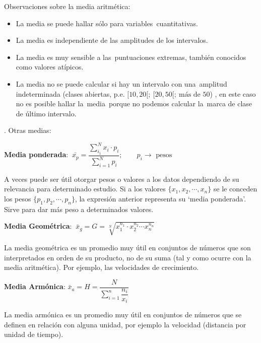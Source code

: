\begin{destacado}
Observaciones sobre la media aritmética:

\begin{adjustwidth}{20pt}{0pt}
\begin{itemize}
	
\item La media se puede hallar sólo para variables cuantitativas.
 
\item La media es independiente de las amplitudes de los intervalos.
 
\item La media es muy sensible a las puntuaciones extremas, también conocidos como valores atípicos.  

\item La media no se puede calcular si hay un intervalo con una amplitud indeterminada (clases abiertas, p.e. $[10,20[; \ [20,50[; \ \text{más de } 50$) ,  en este caso no es posible hallar la media porque no podemos calcular la marca de clase de último intervalo.	
\end{itemize}
\end{adjustwidth}
\end{destacado}


\begin{definition}
	. Otras medias:
	
	\textbf{Media ponderada}: $\ \bar{x_p}= \dfrac{\displaystyle \sum_{i_1}^N x_i\cdot p_i}{\displaystyle \sum_{i=1}^N p_i}; \qquad p_i \to \text{ pesos}$
	
	\vspace {3mm}  \small{A veces puede ser útil otorgar pesos o valores a los datos dependiendo de su relevancia para determinado estudio. Si a los valores $\{x_1,x_2,\cdots ,x_n\}$ se le conceden los pesos  $\{p_1,p_2,\cdots ,p_n\}$, la expresión anterior representa su `media ponderada'. Sirve para dar más peso a determinados valores.}
	
	\vspace{4mm} \textbf{Media Geométrica}: $\ \bar{x}_g=G= \displaystyle \sqrt[N]{x_1^{n_1} \cdot x_2^{n_2} \cdots x_n^{n_n}}$
	
	\vspace {3mm} \small{La media geométrica es un promedio muy útil en conjuntos de números que son interpretados en orden de su producto, no de su suma (tal y como ocurre con la media aritmética). Por ejemplo, las velocidades de crecimiento.}
	
	\vspace{4mm} \textbf{Media Armónica}: $\bar{x}_a=H=\dfrac{N} { \displaystyle \sum_{i=1}^n { \dfrac {n_i}{x_i} } } $
	
	\vspace {3mm} \small{La media armónica es un promedio muy útil en conjuntos de números que se definen en relación con alguna unidad, por ejemplo la velocidad (distancia por unidad de tiempo)}.
\end{definition}


